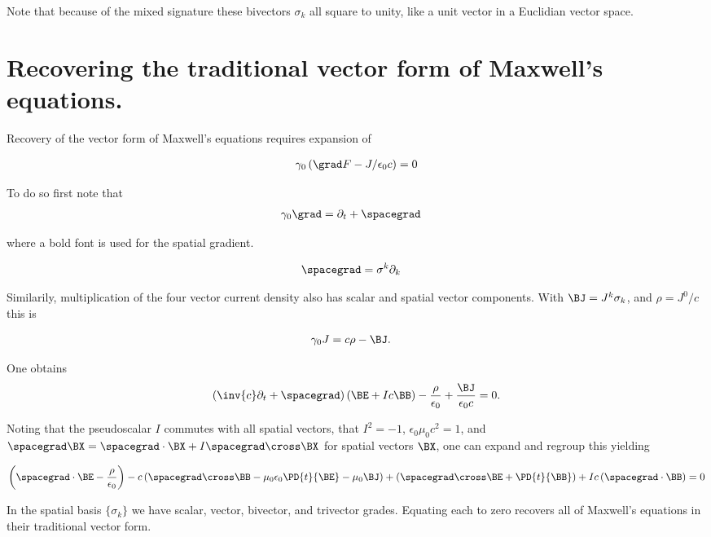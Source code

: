 Note that because of the mixed signature these bivectors $\sigma_k$ all square to unity, like a unit vector in a Euclidian vector space.

\section{Recovering the traditional vector form of Maxwell's equations.}

Recovery of the vector form of Maxwell's equations requires expansion of

\begin{align}\label{eqn:maxwellsFromGA:13}
\gamma_0 \left( \grad F - J/\epsilon_0 c \right) = 0 
\end{align}

To do so first note that 
\begin{align}\label{eqn:maxwellsFromGA:14}
\gamma_0 \grad &= \partial_t + \spacegrad 
\end{align}

where a bold font is used for the spatial gradient.

\begin{align}\label{eqn:maxwellsFromGA:15}
\spacegrad &= \sigma^k \partial_k
\end{align}

Similarily, multiplication of the four vector current density also has scalar and spatial vector components.  With $\BJ = J^k \sigma_k$, and $\rho = J^0/c$ this is

\begin{align}\label{eqn:maxwellsFromGA:16}
\gamma_0 J &= c \rho - \BJ.
\end{align}

One obtains
\begin{align}\label{eqn:maxwellsFromGA:17}
\left( \inv{c} \partial_t + \spacegrad \right) (\BE + I c \BB) - \frac{\rho}{\epsilon_0} + \frac{\BJ}{\epsilon_0 c} = 0.
\end{align}

Noting that the pseudoscalar $I$ commutes with all spatial vectors, that $I^2 = -1$, $\epsilon_0 \mu_0 c^2 = 1$, and $\spacegrad \BX = \spacegrad \cdot \BX + I \spacegrad \cross \BX$ for spatial vectors $\BX$, one can expand and regroup this yielding

\begin{align}\label{eqn:maxwellsFromGA:n}
\left( \spacegrad \cdot \BE - \frac{\rho}{\epsilon_0} \right)
- 
c \left( \spacegrad \cross \BB - \mu_0 \epsilon_0 \PD{t}{\BE} - \mu_0 \BJ \right)
+ \left( \spacegrad \cross \BE + \PD{t}{\BB} \right)
+ I c \left( \spacegrad \cdot \BB \right)
= 0 
\end{align}

In the spatial basis $\{\sigma_k\}$ we have scalar, vector, bivector, and trivector grades.  Equating each to zero recovers all of Maxwell's equations in their traditional vector form.

\EndNoBibArticle
